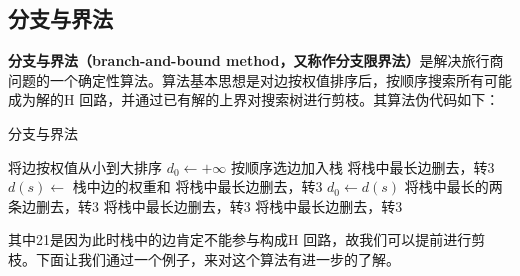 \documentclass[11pt,a4paper,openany]{book}
\begin{document}
\subsection{分支与界法}
\indent \textbf{分支与界法（branch-and-bound method，又称作分支限界法）}是解决旅行商问题的一个确定性算法。算法基本思想是对边按权值排序后，按顺序搜索所有可能成为解的H 回路，并通过已有解的上界对搜索树进行剪枝。其算法伪代码如下：\\
\begin{algorithm}
\renewcommand{\algorithmicrequire}{\textbf{Input:}}
\renewcommand\algorithmicensure {\textbf{Output:} }
    \caption{分支与界法}
    \label{alg:6}%
    \begin{algorithmic}[1]
      \label{alg:babm}  %
      \STATE 将边按权值从小到大排序
      \STATE $d_0\leftarrow +\infty$
         \STATE 按顺序选边加入栈
       \ELSE
          \STATE 将栈中最长边删去，转3
       \ENDIF
       \STATE $d(s)\leftarrow$ 栈中边的权重和
            \STATE 将栈中最长边删去，转3
       \ENDIF
               \STATE $d_0\leftarrow d(s)$
               \STATE 将栈中最长的两条边删去，转3
            \ELSE
                \STATE 将栈中最长边删去，转3
            \ENDIF
       \ELSE
            \STATE 将栈中最长边删去，转3
        \ENDIF
       \ENDIF
      \ENDWHILE
    \end{algorithmic}
\end{algorithm}
\indent 其中21是因为此时栈中的边肯定不能参与构成H 回路，故我们可以提前进行剪枝。下面让我们通过一个例子，来对这个算法有进一步的了解。\\
\end{document}
